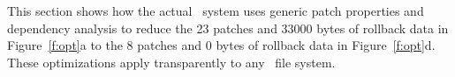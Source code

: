 This section shows how the actual \Kudos\ system uses generic patch
properties and dependency analysis to reduce the 23 patches and 33000 bytes
of rollback data in Figure~\ref{f:opt}a to the 8 patches and 0 bytes of
rollback data in Figure~\ref{f:opt}d.
%
These optimizations apply transparently to any \Kudos\ file system.


\begin{comment}

Challenges in a \patch-based file system implementation include:

\textbf{Buffer cache graph traversal.}
%
In order to evict and write a block, the buffer cache must choose a block
$b$,
%
and then find a set of \patches\ $P_b \subseteq \PMem[b]$ whose dependencies
satisfy a graph property, namely that $\PDepset{P_b} \subseteq P_b \cup
\PDisk$.
%
It usually makes sense to define $P_b$ maximally---that is, as the
\emph{largest} corresponding set of \patches.
%
In the ideal (and common) case $P_b = \PMem[b]$, which lets the cache reuse
$b$'s memory once $P_b$ is committed to disk.  However, in some cases there
may be no block for which $P_b = \PMem[b]$.
%
It would also be nice if the blocks chosen for writing also maximized the
disk's commit rate, by minimizing seeks and so forth.

A naive implementation might calculate, for each in-memory block $b$, the
largest set of \patches\ $P_b \subseteq \PMem[b]$ with $\PDepset{P_b}
\subseteq P_b \cup \PDisk$, then evict some block close to previously
written blocks and with few rolled-back \patches\ (where $\PMem[b] - P_b$
is small).
%
This, however, would be extraordinarily expensive.
%
Finding $P_b$ requires traversing a dependency graph which might contain
thousands and thousands of nodes.
%
Doing so for each block, once per eviction, would take huge amounts of CPU
time.


\textbf{Rollback memory usage.}
%
Only a small fraction of \patches\ will ever need to be rolled back.
%
For example, most data writes never need to be rolled back in any file
system.
%
If a \patch\ won't be rolled back under any circumstances, the memory and
CPU time spent to preserve the old version is wasted.


\textbf{\Patch\ memory usage.}
%
Patches themselves take up memory and require time to allocate, free, and
traverse.
%
If two \patches\ have redundant dependencies, it would be faster to combine
them.




The next section tackles all of these challenges.
\end{comment}



